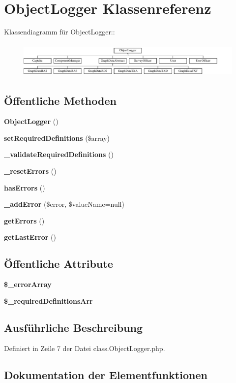 \section{ObjectLogger Klassenreferenz}
\label{classObjectLogger}
Klassendiagramm für ObjectLogger::\begin{figure}[H]
\begin{center}
\leavevmode
\includegraphics[height=1.79104cm]{classObjectLogger}
\end{center}
\end{figure}
\subsection*{Öffentliche Methoden}
\begin{CompactItemize}
\item 
{\bf ObjectLogger} ()
\item 
{\bf setRequiredDefinitions} (\$array)
\item 
{\bf \_\-validateRequiredDefinitions} ()
\item 
{\bf \_\-resetErrors} ()
\item 
{\bf hasErrors} ()
\item 
{\bf \_\-addError} (\$error, \$valueName=null)
\item 
{\bf getErrors} ()
\item 
{\bf getLastError} ()
\end{CompactItemize}
\subsection*{Öffentliche Attribute}
\begin{CompactItemize}
\item 
{\bf \$\_\-errorArray}
\item 
{\bf \$\_\-requiredDefinitionsArr}
\end{CompactItemize}


\subsection{Ausführliche Beschreibung}


Definiert in Zeile 7 der Datei class.ObjectLogger.php.

\subsection{Dokumentation der Elementfunktionen}
